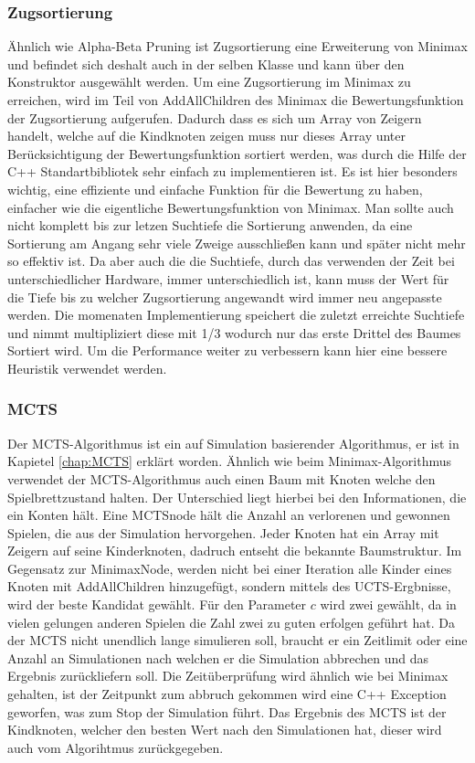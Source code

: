 \documentclass[12pt,a4paper,bibliography=totocnumbered,listof=totocnumbered]{article}
\begin{document}
\subsubsection{Zugsortierung}
Ähnlich wie Alpha-Beta Pruning ist Zugsortierung eine Erweiterung von Minimax und befindet sich deshalt auch in der selben Klasse und kann über den 
Konstruktor ausgewählt werden. 
Um eine Zugsortierung im Minimax zu erreichen, wird im Teil von AddAllChildren des Minimax die Bewertungsfunktion der Zugsortierung aufgerufen.
Dadurch dass es sich um Array von Zeigern handelt, welche auf die Kindknoten zeigen muss nur dieses Array unter Berücksichtigung der Bewertungsfunktion
sortiert werden, was durch die Hilfe der C++ Standartbibliotek sehr einfach zu implementieren ist. Es ist hier besonders wichtig, eine effiziente und einfache Funktion für die 
Bewertung zu haben, einfacher wie die eigentliche Bewertungsfunktion von Minimax. Man sollte auch nicht komplett bis zur letzen Suchtiefe die Sortierung anwenden, 
da eine Sortierung am Angang sehr viele Zweige ausschließen kann und später nicht mehr so effektiv ist. Da aber auch die die Suchtiefe, durch das verwenden der Zeit bei 
unterschiedlicher Hardware, immer unterschiedlich ist, kann muss der Wert für die Tiefe bis zu welcher Zugsortierung angewandt wird immer neu angepasste werden.
Die momenaten Implementierung speichert die zuletzt erreichte Suchtiefe und nimmt multipliziert diese mit 1/3 wodurch nur das erste Drittel des Baumes Sortiert wird. 
Um die Performance weiter zu verbessern kann hier eine bessere Heuristik verwendet werden.


\subsubsection{MCTS}
Der MCTS-Algorithmus ist ein auf Simulation basierender Algorithmus, er ist in Kapietel \ref{chap:MCTS} erklärt worden.
Ähnlich wie beim Minimax-Algorithmus verwendet der MCTS-Algorithmus auch einen Baum mit Knoten welche den Spielbrettzustand halten.
Der Unterschied liegt hierbei bei den Informationen, die ein Konten hält. Eine MCTSnode hält die Anzahl an verlorenen und gewonnen Spielen,
die aus der Simulation hervorgehen. Jeder Knoten hat ein Array mit Zeigern auf seine Kinderknoten, dadruch entseht die bekannte Baumstruktur.
Im Gegensatz zur MinimaxNode, werden nicht bei einer Iteration alle Kinder eines Knoten mit AddAllChildren hinzugefügt, sondern mittels des 
UCTS-Ergbnisse, wird der beste Kandidat gewählt. Für den Parameter $c$ wird zwei gewählt, da in vielen gelungen anderen Spielen die Zahl zwei 
zu guten erfolgen geführt hat. Da der MCTS nicht unendlich lange simulieren soll, braucht er ein Zeitlimit oder eine Anzahl an Simulationen
nach welchen er die Simulation abbrechen und das Ergebnis zurückliefern soll. Die Zeitüberprüfung wird ähnlich wie bei Minimax gehalten,
ist der Zeitpunkt zum abbruch gekommen wird eine C++ Exception geworfen, was zum Stop der Simulation führt. 
Das Ergebnis des MCTS ist der Kindknoten, welcher den besten Wert nach den Simulationen hat, dieser wird auch vom Algorihtmus zurückgegeben.
\end{document}
